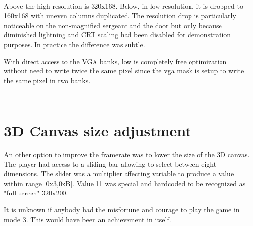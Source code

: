 \\
\par
Above the high resolution is 320x168. Below, in low resolution, it is dropped to 160x168 with uneven columns duplicated. The resolution drop is particularly noticeable on the non-magnified sergeant and the door but only because diminished lightning and CRT scaling had been disabled for demonstration purposes. In practice the difference was subtle.\\
\par
With direct access to the VGA banks, low is completely free optimization without need to write twice the same pixel since the vga mask is setup to write the same pixel in two banks.\\
\par
{}\\






\section{3D Canvas size adjustment}
An other option to improve the framerate was to lower the size of the 3D canvas. The player had access to a sliding bar allowing to select between eight dimensions. The slider was a multiplier affecting variable  to produce a value within range [0x3,0xB]. Value 11 was special and hardcoded to be recognized as "full-screen" 320x200.\\
\par
\vspace{4mm}
\par
It is unknown if anybody had the misfortune and courage to play the game in mode 3. This would have been an achievement in itself.\\
\par
{}
\par
{}

